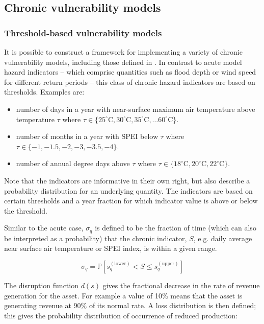 \documentclass[a4paper,11pt]{extarticle} %
\theoremstyle{definition}
\begin{document}
\subsection{Chronic vulnerability models}

\subsubsection{Threshold-based vulnerability models}
It is possible to construct a framework for implementing a variety of chronic vulnerability models, including those defined in \cite{LuoEtAl:2021}. In contrast to acute model hazard indicators -- which comprise quantities such as flood depth or wind speed for different return periods -- this class of chronic hazard indicators are based on thresholds. Examples are:

\begin{itemize}
    \item number of days in a year with near-surface maximum air temperature above temperature $\tau$ where $\tau \in \{ 25 ^\circ \mathrm{C}, 30 ^\circ \mathrm{C}, 35^\circ \mathrm{C}, \dots 60^\circ \mathrm{C} \}$.
    \item number of months in a year with SPEI \cite{VicenteSerranoEtAl:2010} below $\tau$ where $\tau \in \{ -1, -1.5, -2, -3, -3.5, -4 \}$.
    \item number of annual degree days above $\tau$ where $\tau \in \{ 18^\circ \mathrm{C}, 20^\circ \mathrm{C}, 22^\circ \mathrm{C} \}$.
\end{itemize}

Note that the indicators are informative in their own right, but also describe a probability distribution for an underlying quantity. The indicators are based on certain thresholds and a year fraction for which indicator value is above or below the threshold.

Similar to the acute case, $\sigma_q$ is defined to be the fraction of time (which can also be interpreted as a probability) that the chronic indicator, $S$, e.g. daily average near surface air temperature or SPEI index, is within a given range.

\begin{equation}
    \label{Eq:Chronic1}
    \sigma_q = \mathbb{P} \left[ s^{(\text{lower})}_q < S \le s^{(\text{upper})}_q \right]
\end{equation}

The disruption function $d(s)$ gives the fractional decrease in the rate of revenue generation for the asset. For example a value of 10\% means that the asset is generating revenue at 90\% of its normal rate. A loss distribution is then defined; this gives the probability distribution of occurrence of reduced production:
\end{document}
